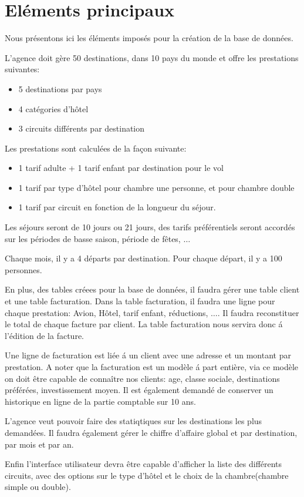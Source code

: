 \section{El\'ements principaux}
Nous pr\'esentons ici les \'el\'ements impos\'es pour la cr\'eation de la base de donn\'ees.

L'agence doit g\`ere 50 destinations, dans 10 pays du monde et offre les prestations suivantes:
\begin{itemize}
\item 5 destinations par pays
\item 4 cat\'egories d'h\^otel
\item 3 circuits diff\'erents par destination
\end{itemize}

Les prestations sont calcul\'ees de la fa\c{c}on suivante:
\begin{itemize}
\item 1 tarif adulte + 1 tarif enfant par destination pour le vol
\item 1 tarif par type d'h\^otel pour chambre une personne, et pour chambre double
\item 1 tarif par circuit en fonction de la longueur du s\'ejour.
\end{itemize}

Les s\'ejours seront de 10 jours ou 21 jours, des tarifs pr\'ef\'erentiels seront accord\'es sur les p\'eriodes de basse saison, p\'eriode de f\^etes, $\ldots$

Chaque mois, il y a 4 d\'eparts par destination. Pour chaque d\'epart, il y a 100 personnes.

En plus, des tables cr\'eees pour la base de donn\'ees, il faudra g\'erer une table client et une table facturation. Dans la table facturation, il faudra une ligne pour chaque prestation: Avion, H\^otel, tarif enfant, r\'eductions, $\ldots$. Il faudra reconstituer le total de chaque facture par client. La table facturation nous servira donc \'a l'\'edition de la facture.

Une ligne de facturation est li\'ee \'a un client avec une adresse et un montant par prestation. A noter que la	facturation est un mod\`ele \'a part enti\`ere, via ce mod\`ele on doit \^etre capable de conna\^itre nos clients: age, classe sociale, destinations pr\'ef\'er\'ees, investissement moyen. Il est \'egalement demand\'e de conserver un historique en ligne de la partie comptable sur 10 ans.

L'agence veut pouvoir faire des statiqtiques sur les destinations les plus demand\'ees. Il faudra \'egalement g\'erer le chiffre d'affaire global et par destination, par mois et par an.

Enfin l'interface utilisateur devra \^etre capable d'afficher la liste des diff\'erents circuits, avec des options sur le type d'h\^otel et le choix de la chambre(chambre simple ou double).
\newpage
